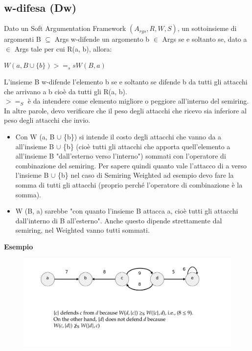 \subsection{w-difesa (Dw)}
Dato un Soft Argumentation Framework $(A_{rgs} , R, W, S)$, un sottoinsieme di argomenti B $\subseteq$ Args w-difende un argomento b $\in$ Args se e soltanto se, dato a $\in$ Args tale per cui R(a, b), allora:
\begin{center}
    $W (a, B \cup \{b\}) >=_s s W (B, a)$
\end{center}
L'insieme B w-difende l'elemento b se e soltanto se difende b da tutti gli attacchi che arrivano a b cioè da tutti gli R(a, b).
\\$>=_S$ è da intendere come elemento migliore o peggiore all'interno del semiring.
    \\In altre parole, devo verificare che il peso degli attacchi che ricevo sia inferiore al peso degli attacchi che invio.
    \begin{itemize}
        \item Con W (a, B $\cup$ \{b\}) si intende il costo degli attacchi che vanno da a all'insieme B $\cup$ \{b\} (cioè tutti gli attacchi che apporta quell'elemento a all'insieme B "dall'esterno verso l'interno") sommati con l'operatore di combinazione del semiring. Per sapere quindi quanto vale l'attacco di a verso l'insieme B $\cup$ \{b\} nel caso di Semiring Weighted ad esempio devo fare la somma di tutti gli attacchi (proprio perché l'operatore di combinazione è la somma).
        \item W (B, a) sarebbe "con quanto l'insieme B attacca a, cioè tutti gli attacchi dall'interno di B all'esterno". Anche questo dipende strettamente dal semiring, nel Weighted vanno tutti sommati.
    \end{itemize}
    \textbf{Esempio}
    \begin{figure}[H]
        \centering
        \includegraphics[width=14cm, keepaspectratio]{img/Cap6/srs2.png}
    \end{figure}

